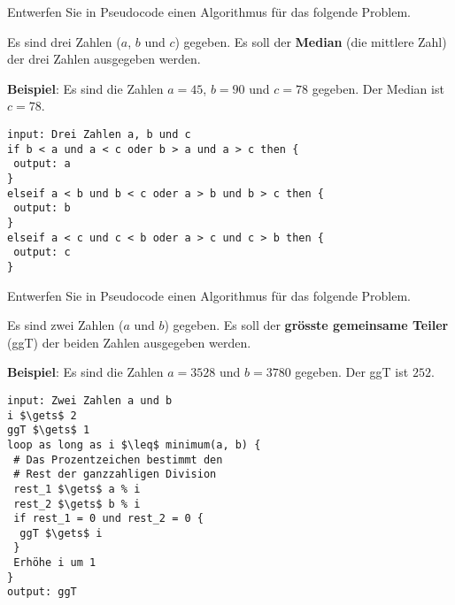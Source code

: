 \begin{exercise}
Entwerfen Sie in Pseudocode einen Algorithmus für das folgende Problem.

\begin{problem}\label{problem-median-3-zahlen}
Es sind drei Zahlen ($a$, $b$ und $c$) gegeben. Es soll der \textbf{Median} (die mittlere Zahl) der drei Zahlen ausgegeben werden.
\end{problem}

\textbf{Beispiel}: Es sind die Zahlen $a = 45$, $b = 90$ und $c = 78$ gegeben. Der Median ist $c = 78$.

\end{exercise}
\begin{solution}
\begin{minipage}{\linewidth}
\begin{lstlisting}[language=pseudocode, caption={Algorithmus für das Problem \protect\autoref{problem-median-3-zahlen}}]
input: Drei Zahlen a, b und c
if b < a und a < c oder b > a und a > c then {
 output: a
}
elseif a < b und b < c oder a > b und b > c then {
 output: b
}
elseif a < c und c < b oder a > c und c > b then {
 output: c
}
\end{lstlisting}
\end{minipage}
\vfill
\end{solution}

\newpage

\begin{exercise}
Entwerfen Sie in Pseudocode einen Algorithmus für das folgende Problem.

\begin{problem}\label{problem-ggt-2-zahlen}
Es sind zwei Zahlen ($a$ und $b$) gegeben. Es soll der \textbf{grösste gemeinsame Teiler} (\acs{ggT}) der beiden Zahlen ausgegeben werden.
\end{problem}

\textbf{Beispiel}: Es sind die Zahlen $a = 3528$ und $b = 3780$ gegeben. Der \acs{ggT} ist $252$.

\fillwithgrid	{4in}
\end{exercise}
\begin{solution}
\begin{minipage}{\linewidth}
\begin{lstlisting}[language=pseudocode, caption={Algorithmus für das Problem \protect\autoref{problem-ggt-2-zahlen}}]
input: Zwei Zahlen a und b
i $\gets$ 2
ggT $\gets$ 1
loop as long as i $\leq$ minimum(a, b) {
 # Das Prozentzeichen bestimmt den 
 # Rest der ganzzahligen Division
 rest_1 $\gets$ a % i
 rest_2 $\gets$ b % i
 if rest_1 = 0 und rest_2 = 0 {
  ggT $\gets$ i
 }
 Erhöhe i um 1
}
output: ggT
\end{lstlisting}
\end{minipage}
\vfill
\end{solution}

